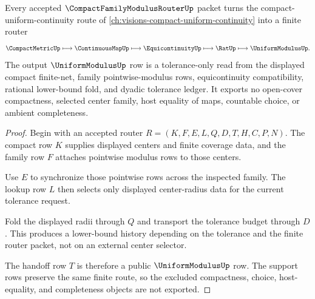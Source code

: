 \begin{theorem}
\label{thm:compact-family-modulus-router-finite-net-route}
Every accepted $\CompactFamilyModulusRouterUp$ packet turns the compact-uniform-continuity route of \autoref{ch:visions-compact-uniform-continuity} into a finite router
$$
\CompactMetricUp
\longmapsto
\ContinuousMapUp
\longmapsto
\EquicontinuityUp
\longmapsto
\RatUp
\longmapsto
\UniformModulusUp .
$$
The output $\UniformModulusUp$ row is a tolerance-only read from the displayed compact finite-net, family pointwise-modulus rows, equicontinuity compatibility, rational lower-bound fold, and dyadic tolerance ledger. It exports no open-cover compactness, selected center family, host equality of maps, countable choice, or ambient completeness.
\end{theorem}
\begin{proof}
Begin with an accepted router $R=(K,F,E,L,Q,D,T,H,C,P,N)$. The compact row $K$ supplies displayed centers and finite coverage data, and the family row $F$ attaches pointwise modulus rows to those centers.

Use $E$ to synchronize those pointwise rows across the inspected family. The lookup row $L$ then selects only displayed center-radius data for the current tolerance request.

Fold the displayed radii through $Q$ and transport the tolerance budget through $D$. This produces a lower-bound history depending on the tolerance and the finite router packet, not on an external center selector.

The handoff row $T$ is therefore a public $\UniformModulusUp$ row. The support rows preserve the same finite route, so the excluded compactness, choice, host-equality, and completeness objects are not exported.
\end{proof}

